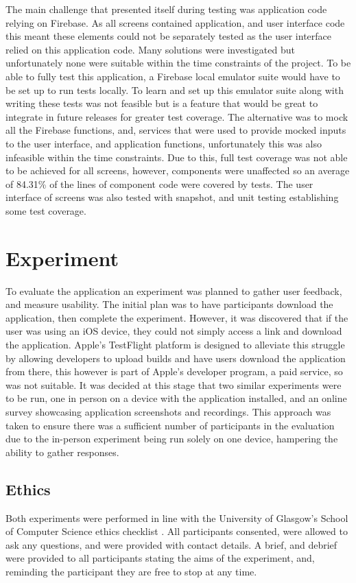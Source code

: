 The main challenge that presented itself during testing was application code relying on Firebase. As all screens contained application, and user interface code this meant these elements could not be separately tested as the user interface relied on this application code. Many solutions were investigated but unfortunately none were suitable within the time constraints of the project. To be able to fully test this application, a Firebase local emulator suite would have to be set up to run tests locally. To learn and set up this emulator suite along with writing these tests was not feasible but is a feature that would be great to integrate in future releases for greater test coverage. The alternative was to mock all the Firebase functions, and, services that were used to provide mocked inputs to the user interface, and application functions, unfortunately this was also infeasible within the time constraints. Due to this, full test coverage was not able to be achieved for all screens, however, components were unaffected so an average of 84.31\% of the lines of component code were covered by tests. The user interface of screens was also tested with snapshot, and unit testing establishing some test coverage.   


\section{Experiment}
To evaluate the application an experiment was planned to gather user feedback, and measure usability. The initial plan was to have participants download the application, then complete the experiment. However, it was discovered that if the user was using an iOS device, they could not simply access a link and download the application. Apple's TestFlight platform is designed to alleviate this struggle by allowing developers to upload builds and have users download the application from there, this however is part of Apple's developer program, a paid service, so was not suitable. It was decided at this stage that two similar experiments were to be run, one in person on a device with the application installed, and an online survey showcasing application screenshots and recordings. This approach was taken to ensure there was a sufficient number of participants in the evaluation due to the in-person experiment being run solely on one device, hampering the ability to gather responses. 

\subsection*{Ethics}
Both experiments were performed in line with the University of Glasgow's School of Computer Science ethics checklist \cite{ethics}. All participants consented, were allowed to ask any questions, and were provided with contact details. A brief, and debrief were provided to all participants stating the aims of the experiment, and, reminding the participant they are free to stop at any time.

